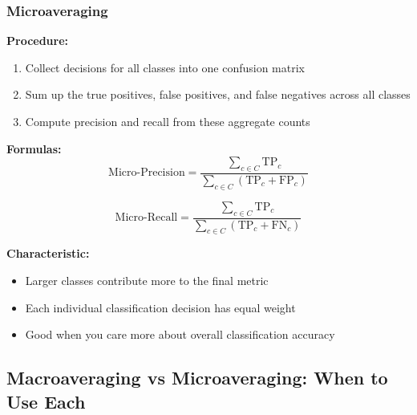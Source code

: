 \documentclass[11pt,a4paper]{article}
\theoremstyle{definition}
\theoremstyle{plain}
\theoremstyle{remark}
\begin{document}
\subsubsection{Microaveraging}

\textbf{Procedure:}
\begin{enumerate}
    \item Collect decisions for all classes into one confusion matrix
    \item Sum up the true positives, false positives, and false negatives across all classes
    \item Compute precision and recall from these aggregate counts
\end{enumerate}

\textbf{Formulas:}
\[
\text{Micro-Precision} = \frac{\sum_{c \in C} \text{TP}_c}{\sum_{c \in C} (\text{TP}_c + \text{FP}_c)}
\]

\[
\text{Micro-Recall} = \frac{\sum_{c \in C} \text{TP}_c}{\sum_{c \in C} (\text{TP}_c + \text{FN}_c)}
\]

\textbf{Characteristic:}
\begin{itemize}
    \item Larger classes contribute more to the final metric
    \item Each individual classification decision has equal weight
    \item Good when you care more about overall classification accuracy
\end{itemize}

\subsection{Macroaveraging vs Microaveraging: When to Use Each}
\end{document}
